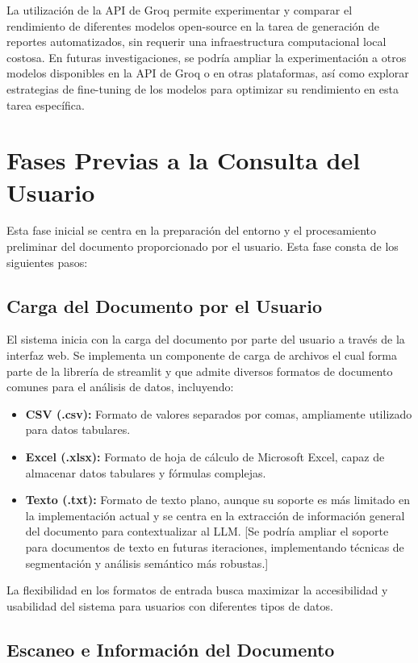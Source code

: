 La utilización de la API de Groq permite experimentar y comparar el rendimiento de diferentes modelos open-source en la tarea de generación de reportes automatizados,  sin requerir una infraestructura computacional local costosa. En futuras investigaciones,  se podría ampliar la experimentación a otros modelos disponibles en la API de Groq o en otras plataformas,  así como explorar estrategias de fine-tuning de los modelos para optimizar su rendimiento en esta tarea específica.


\section{Fases Previas a la Consulta del Usuario}

Esta fase inicial se centra en la preparación del entorno y el procesamiento preliminar del documento proporcionado por el usuario. Esta fase consta de los siguientes pasos:

\subsection{Carga del Documento por el Usuario}

El sistema inicia con la carga del documento por parte del usuario a través de la interfaz web. Se implementa un componente de carga de archivos el cual forma parte de la librería de streamlit y que admite diversos formatos de documento comunes para el análisis de datos, incluyendo:
\begin{itemize}
	\item \textbf{CSV (.csv):}  Formato de valores separados por comas, ampliamente utilizado para datos tabulares.
	\item \textbf{Excel (.xlsx):}  Formato de hoja de cálculo de Microsoft Excel, capaz de almacenar datos tabulares y fórmulas complejas.
	\item \textbf{Texto (.txt):}  Formato de texto plano, aunque su soporte es más limitado en la implementación actual y se centra en la extracción de información general del documento para contextualizar al LLM.  [Se podría ampliar el soporte para documentos de texto en futuras iteraciones, implementando técnicas de segmentación y análisis semántico más robustas.]
\end{itemize}

La flexibilidad en los formatos de entrada busca maximizar la accesibilidad y usabilidad del sistema para usuarios con diferentes tipos de datos.

\subsection{Escaneo e Información del Documento}

